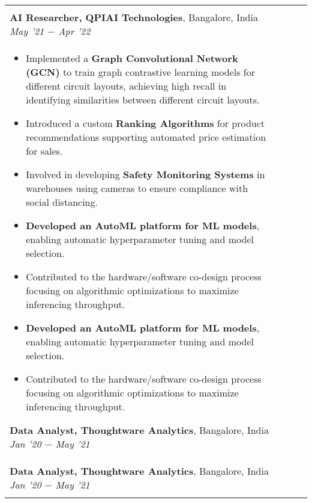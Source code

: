 \documentclass[10pt,a4]{article}
\begin{document}
{\begin{tabu}
\begin{center}
\begin{tabular} {p{} p{} p{} p{}}
\begin{flushleft}
    \vspace{0.5mm}
    \hspace{1.5mm} \textbf{\large AI Researcher, QPIAI Technologies},  Bangalore, India \hfill \textit{\large May '21 $-$ Apr '22}	\\
    
    \vspace{0.5mm}
    \hspace{1.5mm} \textbf{\large AI Researcher, QPIAI Technologies},  Bangalore, India \hfill \textit{\large May '21 $-$ Apr '22}	\\
    \begin{itemize}
        \item Implemented a \textbf{Graph Convolutional Network (GCN)} to train graph contrastive learning models for different circuit layouts, achieving high recall in identifying similarities between different circuit layouts.
        \item Introduced a custom \textbf{Ranking Algorithms} for product recommendations supporting automated price estimation for sales.
        \item Involved in developing \textbf{Safety Monitoring Systems} in warehouses using cameras to ensure compliance with social distancing.
        \item \textbf{Developed an AutoML platform for ML models}, enabling automatic hyperparameter tuning and model selection.
        \item Contributed to the hardware/software co-design process focusing on algorithmic optimizations to maximize inferencing throughput.
        
        \item \textbf{Developed an AutoML platform for ML models}, enabling automatic hyperparameter tuning and model selection.
        \item Contributed to the hardware/software co-design process focusing on algorithmic optimizations to maximize inferencing throughput.
        
    \end{itemize}		

    \vspace{0.5mm}
    \hspace{1.5mm} \textbf{\large Data Analyst, Thoughtware Analytics},  Bangalore, India \hfill \textit{\large Jan '20 $-$ May '21}	\\		
    \vspace{0.5mm}
    \hspace{1.5mm} \textbf{\large Data Analyst, Thoughtware Analytics},  Bangalore, India \hfill \textit{\large Jan '20 $-$ May '21}	\\		
    \begin{itemize}
          

\end{itemize}
\end{flushleft}
\end{tabular}
\end{center}
\end{tabu}}
\end{document}
